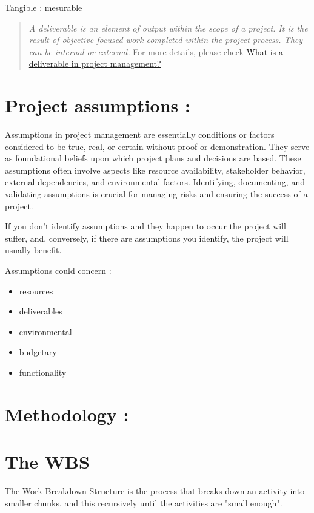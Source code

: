 \documentclass{article}
\begin{document}
Tangible : mesurable


\begin{quote}
\textit{A deliverable is an element of output within the scope of a project. It is the result of objective-focused work completed within the project process. They can be internal or external.}\newline
For more details, please check \href{https://www.wrike.com/project-management-guide/faq/what-is-a-deliverable-in-project-management/}{What is a deliverable in project management?}
\end{quote}

\section{Project assumptions :}
Assumptions in project management are essentially conditions or factors considered to be true, real, or certain without proof or demonstration. They serve as foundational beliefs upon which project plans and decisions are based. These assumptions often involve aspects like resource availability, stakeholder behavior, external dependencies, and environmental factors. Identifying, documenting, and validating assumptions is crucial for managing risks and ensuring the success of a project.

If you don’t identify assumptions and they happen to occur  the project will suffer, and, conversely, if there are assumptions you identify, the project will usually benefit.

Assumptions could concern :
\begin{itemize}
	\item resources
	\item deliverables
	\item environmental
	\item budgetary
	\item functionality
\end{itemize}

\section{Methodology :}



\section{The WBS}
The Work Breakdown Structure is the process that breaks down an activity into smaller chunks, and this recursively until the activities are "small enough".
\end{document}
